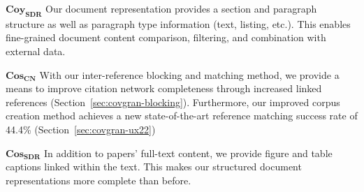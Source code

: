 $\mathbf{Coy_{SDR}}$ Our document representation provides a section and paragraph structure as well as paragraph type information (text, listing, etc.). This enables fine-grained document content comparison, filtering, and combination with external data. %

$\mathbf{Cos_{CN}}$ With our inter-reference blocking and matching method, we provide a means to improve citation network completeness through increased linked references (Section~\ref{sec:covgran-blocking}). Furthermore, our improved corpus creation method achieves a new state-of-the-art reference matching success rate of 44.4\% (Section~\ref{sec:covgran-ux22})

$\mathbf{Cos_{SDR}}$ In addition to papers' full-text content, we provide figure and table captions linked within the text. This makes our structured document representations more complete than before.
